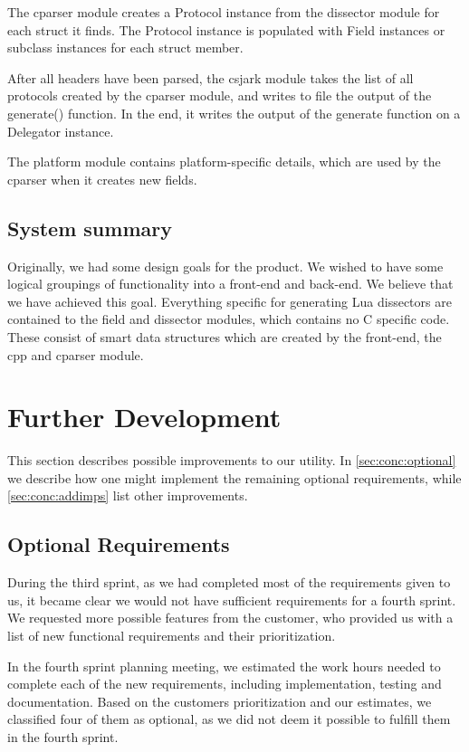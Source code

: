 The cparser module creates a Protocol instance from the dissector module for
each struct it finds. The Protocol instance is populated with Field instances
or subclass instances for each struct member.

After all headers have been parsed, the csjark module takes the list of all
protocols created by the cparser module, and writes to file the output of the
generate() function. In the end, it writes the output of the generate function
on a Delegator instance.

The platform module contains platform-specific details, which are used by the
cparser when it creates new fields.

\subsection{System summary}
Originally, we had some design goals for the product. We wished to have some
logical groupings of functionality into a front-end and back-end. We believe
that we have achieved this goal. Everything specific for generating Lua
dissectors are contained to the field and dissector modules, which contains
no C specific code. These consist of smart data structures which are created
by the front-end, the cpp and cparser module.


\section{Further Development}
\label{sec:eval:furtherdev}
This section describes possible improvements to our utility.
In \autoref{sec:conc:optional} we describe how one might implement the remaining
optional requirements, while \autoref{sec:conc:addimps} list other improvements.

\subsection{Optional Requirements}
\label{sec:conc:optional}
During the third sprint, as we had completed most of the requirements given to
us, it became clear we would not have sufficient requirements for a fourth
sprint. We requested more possible features from the customer, who provided us
with a list of new functional requirements and their prioritization.

In the fourth sprint planning meeting, we estimated the work hours needed to
complete each of the new requirements, including implementation, testing and
documentation. Based on the customers prioritization and our estimates, we
classified four of them as optional, as we did not deem it possible to
fulfill them in the fourth sprint.

